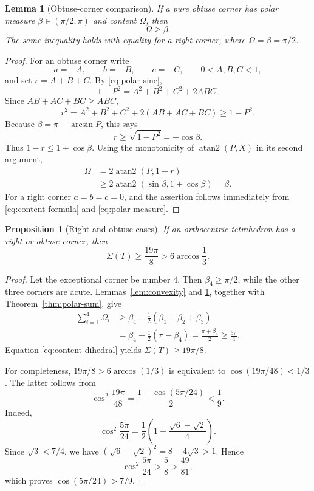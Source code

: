 \documentclass[11pt,a4paper]{article}
\newtheorem{lemma}[theorem]{Lemma}
\newtheorem{proposition}[theorem]{Proposition}
\theoremstyle{definition}
\theoremstyle{remark}
\newcommand{\atanTwo}{\operatorname{atan2}}
\begin{document}
\begin{lemma}[Obtuse-corner comparison]\label{lem:obtuse-corner}
If a pure obtuse corner has polar measure $\beta\in(\pi/2,\pi)$ and content
$\Omega$, then
\begin{equation}\label{eq:obtuse-comparison}
 \Omega\geq\beta.
\end{equation}
The same inequality holds with equality for a right corner, where
$\Omega=\beta=\pi/2$.
\end{lemma}

\begin{proof}
For an obtuse corner write
\[
 a=-A,\qquad b=-B,\qquad c=-C,
 \qquad 0<A,B,C<1,
\]
and set $r=A+B+C$.  By \eqref{eq:polar-sine},
\[
 1-P^2=A^2+B^2+C^2+2ABC.
\]
Since $AB+AC+BC\geq ABC$,
\[
 r^2=A^2+B^2+C^2+2(AB+AC+BC)\geq1-P^2.
\]
Because $\beta=\pi-\arcsin P$, this says
\[
 r\geq\sqrt{1-P^2}=-\cos\beta.
\]
Thus $1-r\leq1+\cos\beta$.  Using the monotonicity of
$\atanTwo(P,X)$ in its second argument,
\begin{align*}
 \Omega
 &=2\atanTwo(P,1-r)\\
 &\geq2\atanTwo(\sin\beta,1+\cos\beta)
 =\beta.
\end{align*}
For a right corner $a=b=c=0$, and the assertion follows immediately from
\eqref{eq:content-formula} and \eqref{eq:polar-measure}.
\end{proof}

\begin{proposition}[Right and obtuse cases]\label{prop:nonacute-case}
If an orthocentric tetrahedron has a right or obtuse corner, then
\begin{equation}\label{eq:stronger-bound}
 \Sigma(T)\geq\frac{19\pi}{8}
 >6\arccos\frac13.
\end{equation}
\end{proposition}

\begin{proof}
Let the exceptional corner be number $4$.  Then $\beta_4\geq\pi/2$, while
the other three corners are acute.  Lemmas~\ref{lem:convexity} and
\ref{lem:obtuse-corner}, together with Theorem~\ref{thm:polar-sum}, give
\begin{align*}
 \sum_{i=1}^4\Omega_i
 &\geq \beta_4+\frac12(\beta_1+\beta_2+\beta_3)\\
 &=\beta_4+\frac12(\pi-\beta_4)
 =\frac{\pi+\beta_4}{2}
 \geq\frac{3\pi}{4}.
\end{align*}
Equation \eqref{eq:content-dihedral} yields
$\Sigma(T)\geq19\pi/8$.

For completeness, $19\pi/8>6\arccos(1/3)$ is equivalent to
$\cos(19\pi/48)<1/3$.  The latter follows from
\[
 \cos^2\frac{19\pi}{48}
 =\frac{1-\cos(5\pi/24)}{2}<\frac19.
\]
Indeed,
\[
 \cos^2\frac{5\pi}{24}
 =\frac12\left(1+\frac{\sqrt6-\sqrt2}{4}\right).
\]
Since $\sqrt3<7/4$, we have
$(\sqrt6-\sqrt2)^2=8-4\sqrt3>1$.  Hence
\[
 \cos^2\frac{5\pi}{24}>\frac58>\frac{49}{81},
\]
which proves $\cos(5\pi/24)>7/9$.
\end{proof}
\end{document}
